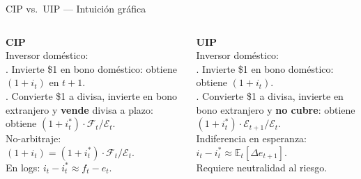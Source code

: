 
\begin{frame}{CIP vs.\ UIP — Intuición gráfica}

  \begin{columns}
    \textbf{CIP} \\[0.3em]
    \small
    Inversor doméstico: \\
    . Invierte \$1 en bono doméstico: obtiene $(1+i_t)$ en $t+1$. \\
    . Convierte \$1 a divisa, invierte en bono extranjero y \textbf{vende} divisa
             a plazo: obtiene $(1+i^*_t)\cdot\mathcal{F}_t/\mathcal{E}_t$.
    \\[0.5em]
    No-arbitraje: $(1+i_t) = (1+i^*_t)\cdot\mathcal{F}_t/\mathcal{E}_t$. \\
    En logs: \textcolor{peacockblue}{$i_t - i^*_t \approx f_t - e_t$}. \checkmark

    \textbf{UIP} \\[0.3em]
    \small
    Inversor doméstico: \\
    . Invierte \$1 en bono doméstico: obtiene $(1+i_t)$.\\
    . Convierte \$1 a divisa, invierte en bono extranjero y \textbf{no cubre}:
             obtiene $(1+i^*_t)\cdot\mathcal{E}_{t+1}/\mathcal{E}_t$.
    \\[0.5em]
    Indiferencia en esperanza: \\
    \textcolor{spicy}{$i_t - i^*_t \approx \mathbb{E}_t[\Delta e_{t+1}]$}. \\[0.3em]
    Requiere neutralidad al riesgo.
  \end{columns}

\end{frame}


